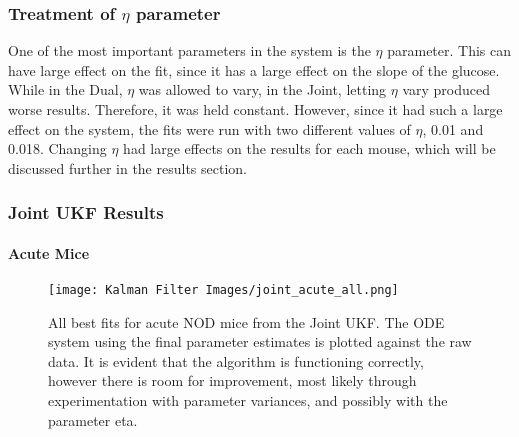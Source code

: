\documentclass{article}
\begin{document}
\subsubsection{Treatment of $\eta$ parameter}
One of the most important parameters in the system is the $\eta$ parameter. This can have large effect on the fit, since it has a large effect on the slope of the glucose. While in the Dual, $\eta$ was allowed to vary, in the Joint, letting $\eta$ vary produced worse results. Therefore, it was held constant. However, since it had such a large effect on the system, the fits were run with two different values of $\eta$, 0.01 and 0.018. Changing $\eta$ had large effects on the results for each mouse, which will be discussed further in the results section. 


\subsubsection{Joint UKF Results}

\paragraph{Acute Mice}

\begin{figure}[H]
    \centering
    \texttt{[image: Kalman Filter Images/joint\_acute\_all.png]}
    \caption{All best fits for acute NOD mice from the Joint UKF. The ODE system using the final parameter estimates is plotted against the raw data. It is evident that the algorithm is functioning correctly, however there is room for improvement, most likely through experimentation with parameter variances, and possibly with the parameter eta.}
    \label{fig:T1D_Joint_AllAcute_Plots}
\end{figure}
\end{document}
